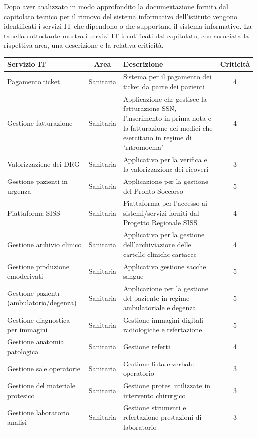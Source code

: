 \documentclass[12pt, a4paper, titlepage]{report}
\begin{document}
		Dopo aver analizzato in modo approfondito la documentazione fornita dal capitolato tecnico per il rinnovo del sistema informativo dell'istituto vengono identificati i servizi IT che dipendono o che supportano il sistema informativo. La tabella sottostante mostra i servizi IT identificati dal capitolato, con associata la rispettiva area, una descrizione e la relativa criticità.
		\newpage
			\begin{longtable}{| p{4cm} | c | p{6cm} | c |}
				\hline
				\textbf{Servizio IT} & \textbf{Area} & \textbf{Descrizione} & \textbf{Criticità} \\ \hline
				Pagamento ticket & Sanitaria & Sistema per il pagamento dei ticket da parte dei pazienti & 4 \\ \hline
				Gestione fatturazione & Sanitaria & Applicazione che gestisce la fatturazione SSN, l'inserimento in prima nota e la fatturazione dei medici che esercitano in regime di `intromoenia' & 4 \\ \hline
				Valorizzazione dei DRG & Sanitaria & Applicativo per la verifica e la valorizzazione dei ricoveri & 3 \\ \hline
				Gestione pazienti in urgenza & Sanitaria & Applicazione per la gestione del Pronto Soccorso & 5 \\ \hline
				Piattaforma SISS & Sanitaria & Piattaforma per l'accesso ai sistemi/servizi forniti dal Progetto Regionale SISS & 4 \\ \hline
				Gestione archivio clinico & Sanitaria & Applicativo per la gestione dell'archiviazione delle cartelle cliniche cartacee & 4 \\ \hline
				Gestione produzione emoderivati & Sanitaria & Applicativo gestione sacche sangue & 5 \\ \hline
				Gestione pazienti (ambulatorio/degenza) & Sanitaria & Applicazione per la gestione del paziente in regime ambulatoriale e degenza & 5 \\ \hline
				Gestione diagnostica per immagini & Sanitaria & Gestione immagini digitali radiologiche e refertazione & 5 \\ \hline
				Gestione anatomia patologica & Sanitaria & Gestione referti & 4 \\ \hline
				Gestione sale operatorie & Sanitaria & Gestione lista e verbale operatorio & 3 \\ \hline
				Gestione del materiale protesico & Sanitaria & Gestione protesi utilizzate in intervento chirurgico & 3 \\ \hline
				Gestione laboratorio analisi & Sanitaria & Gestione strumenti e refertazione prestazioni di laboratorio & 3 \\ \hline

\end{longtable}
\end{document}
